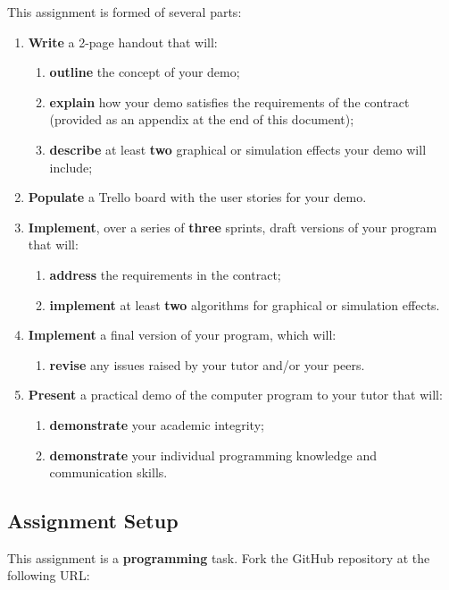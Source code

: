 \documentclass{../../fal_assignment}
\begin{document}
This assignment is formed of several parts:
\begin{enumerate}[label=(\Alph*)]
	\item \textbf{Write} a 2-page handout that will:
		\begin{enumerate}[label=(\roman*)]
			\item \textbf{outline} the concept of your demo;
			\item \textbf{explain} how your demo satisfies the requirements of the contract (provided as an appendix at the end of this document);
			\item \textbf{describe} at least \textbf{two} graphical or simulation effects your demo will include;
		\end{enumerate}
	\item \textbf{Populate} a Trello board with the user stories for your demo.
	\item \textbf{Implement}, over a series of \textbf{three} sprints, draft versions of your program that will:
		\begin{enumerate}[label=(\roman*)]
			\item \textbf{address} the requirements in the contract;
			\item \textbf{implement} at least \textbf{two} algorithms for graphical or simulation effects.
		\end{enumerate}
	\item \textbf{Implement} a final version of your program, which will:
		\begin{enumerate}[label=(\roman*)]
			\item \textbf{revise} any issues raised by your tutor and/or your peers.
		\end{enumerate}
	\item \textbf{Present} a practical demo of the computer program to your tutor that will:
		\begin{enumerate}[label=(\roman*)]
			\item \textbf{demonstrate} your academic integrity;
			\item \textbf{demonstrate} your individual programming knowledge and communication skills.
		\end{enumerate}
\end{enumerate}

\subsection*{Assignment Setup}

This assignment is a \textbf{programming} task. Fork the GitHub repository at the following URL:
\end{document}
